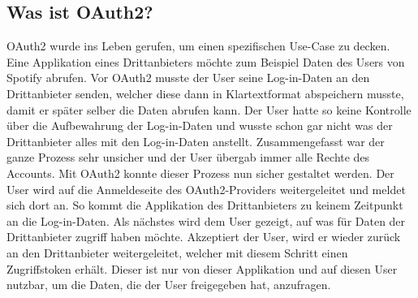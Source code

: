 \subsection{Was ist OAuth2?}
OAuth2 wurde ins Leben gerufen, um einen spezifischen Use-Case zu decken. Eine Applikation eines Drittanbieters möchte zum Beispiel Daten des Users von Spotify abrufen. Vor OAuth2 musste der User seine Log-in-Daten an den Drittanbieter senden, welcher diese dann in Klartextformat abspeichern musste, damit er später selber die Daten abrufen kann.
\newline
Der User hatte so keine Kontrolle über die Aufbewahrung der Log-in-Daten und wusste schon gar nicht was der Drittanbieter alles mit den Log-in-Daten anstellt. Zusammengefasst war der ganze Prozess sehr unsicher und der User übergab immer alle Rechte des Accounts.
\newline
\newline
Mit OAuth2 konnte dieser Prozess nun sicher gestaltet werden. Der User wird auf die Anmeldeseite des OAuth2-Providers weitergeleitet und meldet sich dort an. So kommt die Applikation des Drittanbieters zu keinem Zeitpunkt an die Log-in-Daten. Als nächstes wird dem User gezeigt, auf was für Daten der Drittanbieter zugriff haben möchte. Akzeptiert der User, wird er wieder zurück an den Drittanbieter weitergeleitet, welcher mit diesem Schritt einen Zugriffstoken erhält. Dieser ist nur von dieser Applikation und auf diesen User nutzbar, um die Daten, die der User freigegeben hat, anzufragen.
\pagebreak
